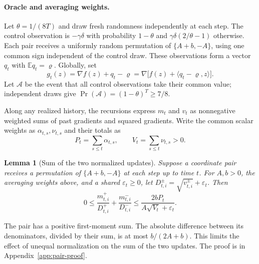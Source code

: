 \documentclass[11pt,letterpaper]{article}
\newtheorem{lemma}[theorem]{Lemma}
\theoremstyle{definition}
\newcommand{\E}{\mathbb E}
\newcommand{\eps}{\varepsilon}
\newcommand{\grad}{\nabla}
\begin{document}
\paragraph{Oracle and averaging weights.}
Let $\theta=1/(8T)$ and draw fresh randomness independently at each step. The control observation is $-\gamma\delta$ with probability $1-\theta$ and $\gamma\delta(2/\theta-1)$ otherwise. Each pair receives a uniformly random permutation of $\{A+b,-A\}$, using one common sign independent of the control draw. These observations form a vector $q_t$ with $\E q_t=\varrho$. Globally, set
\[
g_t(z)=\grad f(z)+q_t-\varrho
=\grad\bigl[f(z)+\langle q_t-\varrho,z\rangle\bigr].
\]
Let $\mathcal A$ be the event that all control observations take their common value; independent draws give $\Pr(\mathcal A)=(1-\theta)^T\ge7/8$.

Along any realized history, the recursions express $m_t$ and $v_t$ as nonnegative weighted sums of past gradients and squared gradients. Write the common scalar weights as $\alpha_{t,s},\nu_{t,s}$ and their totals as
\[
P_t=\sum_{s\le t}\alpha_{t,s},\qquad
V_t=\sum_{s\le t}\nu_{t,s}>0.
\]

\begin{lemma}[Sum of the two normalized updates]
\label{lem:paired-updates}
Suppose a coordinate pair receives a permutation of $\{A+b,-A\}$ at
each step up to time $t$. For $A,b>0$, the averaging weights above, and a shared
$\eps_t\ge0$, let $D_{t,i}^{\pm}=\sqrt{v_{t,i}^{\pm}}+\eps_t$. Then
\begin{equation}
0\le
\frac{m_{t,i}^{+}}{D_{t,i}^{+}}
+\frac{m_{t,i}^{-}}{D_{t,i}^{-}}
\le\frac{2bP_t}{A\sqrt{V_t}+\eps_t}.
\label{eq:paired-update-bound}
\end{equation}
\end{lemma}

The pair has a positive first-moment sum. The absolute difference between
its denominators, divided by their sum, is at most $b/(2A+b)$. This limits
the effect of unequal normalization on the sum of the two updates.
The proof is in Appendix~\ref{app:pair-proof}.
\end{document}
